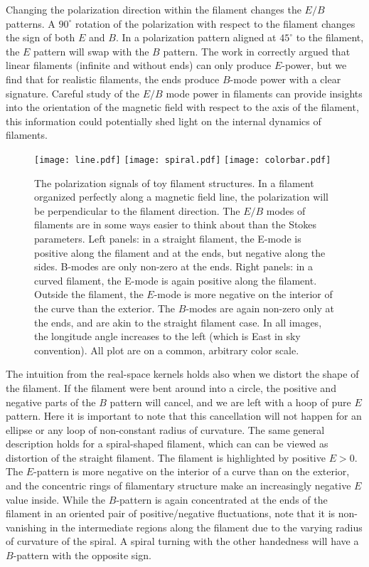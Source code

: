 Changing the polarization direction within the filament changes the $E/B$ patterns.  A $90^\circ$ rotation of the polarization with respect to the filament changes the sign of both $E$ and $B$.  In a polarization pattern aligned at $45^\circ$ to the filament, the $E$ pattern will swap with the $B$ pattern.  The work in \cite{Zaldarriaga2001a} correctly argued that linear filaments (infinite and without ends) can only produce $E$-power, but we find that for realistic filaments, the ends produce $B$-mode power with a clear signature.  Careful study of the $E/B$ mode power in filaments can provide insights into the orientation of the magnetic field with respect to the axis of the filament, this information could potentially shed light on the internal dynamics of filaments.
% 
\begin{figure}[t]
\texttt{[image: line.pdf]}
\texttt{[image: spiral.pdf]}
\texttt{[image: colorbar.pdf]}
\caption{ The polarization signals of toy filament structures. In a filament organized perfectly along a magnetic field line, the polarization will be perpendicular to the filament direction.  The $E/B$ modes of filaments are in some ways easier to think about than the Stokes parameters. Left panels: in a straight filament, the E-mode is positive along the filament and at the ends, but negative along the sides.  B-modes are only non-zero at the ends.  Right panels: in a curved filament, the E-mode is again positive along the filament.  Outside the filament, the $E$-mode is more negative on the interior of the curve than the exterior.  The $B$-modes are again non-zero only at the ends, and are akin to the straight filament case. In all images, the longitude angle increases to the left (which is East in sky convention).  All plot are on a common, arbitrary color scale.}
\label{fig:polfilaments}
\end{figure}
%
\indent The intuition from the real-space kernels holds also when we distort the shape of the filament.  If the filament were bent around into a circle, the positive and negative parts of the $B$ pattern will cancel, and we are left with a hoop of pure $E$ pattern. Here it is important to note that this cancellation will not happen for an ellipse or any loop of non-constant radius of curvature.  The same general description holds for a spiral-shaped filament, which can can be viewed as distortion of the straight filament.  The filament is highlighted by positive $E>0$.  The $E$-pattern is more negative on the interior of a curve than on the exterior, and the concentric rings of filamentary structure make an increasingly negative $E$ value inside. While the $B$-pattern is again concentrated at the ends of the filament in an oriented pair of positive/negative fluctuations, note that it is non-vanishing in the intermediate regions along the filament due to the varying radius of curvature of the spiral.  A spiral turning with the other handedness will have a $B$-pattern with the opposite sign.

